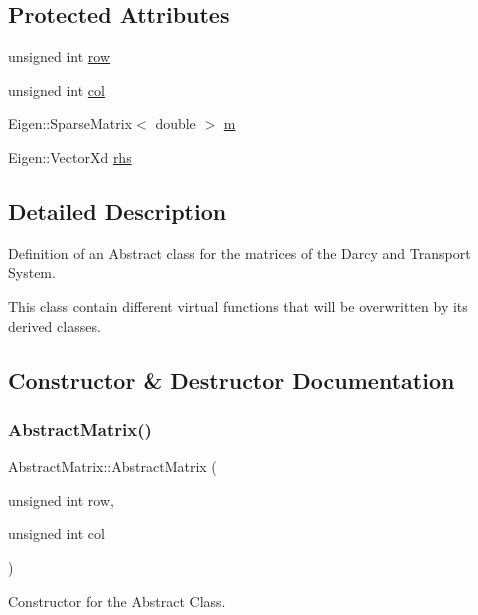 \subsection*{Protected Attributes}
\begin{DoxyCompactItemize}
\item 
unsigned int \hyperlink{classAbstractMatrix_a27fb46bf2853d4927d92a81b8b7773fb}{row}
\item 
unsigned int \hyperlink{classAbstractMatrix_af3ad3551ce094979488cef5df0e4fc1d}{col}
\item 
Eigen\+::\+Sparse\+Matrix$<$ double $>$ \hyperlink{classAbstractMatrix_afec41dcfd1da4b3b44b787249cc5da87}{m}
\item 
Eigen\+::\+Vector\+Xd \hyperlink{classAbstractMatrix_aa3665f993211fb39b9c6ee34384223c5}{rhs}
\end{DoxyCompactItemize}


\subsection{Detailed Description}
Definition of an Abstract class for the matrices of the Darcy and Transport System. 

This class contain different virtual functions that will be overwritten by its derived classes. 

\subsection{Constructor \& Destructor Documentation}
\mbox{\label{classAbstractMatrix_ace76e143b5a5225394ad333d3b1aa1bf}} 
\subsubsection{\texorpdfstring{Abstract\+Matrix()}{AbstractMatrix()}}
{\footnotesize\ttfamily Abstract\+Matrix\+::\+Abstract\+Matrix (\begin{DoxyParamCaption}\item[{unsigned int}]{row,  }\item[{unsigned int}]{col }\end{DoxyParamCaption})}



Constructor for the Abstract Class. 

